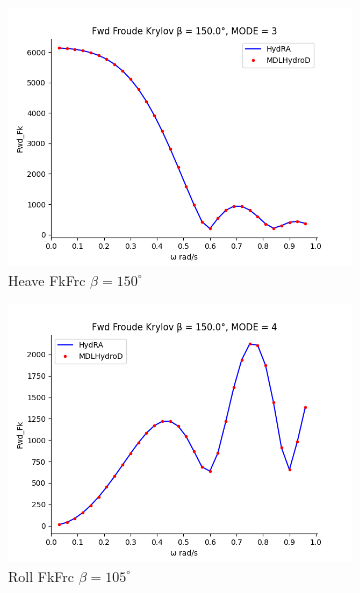 \begin{figure}[H]
    \vspace{5pt}%
    \begin{subfigure}[b]{0.45\textwidth}
        \includegraphics[width=\textwidth]{plots/kcs/fk/fk3.png}
        \caption{Heave FkFrc $\beta = 150^{\circ}$}
    \end{subfigure}
    \begin{subfigure}[b]{0.45\textwidth}
        \includegraphics[width=\textwidth]{plots/kcs/fk/fk4.png}
        \caption{Roll FkFrc $\beta = 105^{\circ}$}
    \end{subfigure}
    \vspace{5pt}%
    \begin{subfigure}[b]{0.45\textwidth}

\end{subfigure}
\end{figure}
